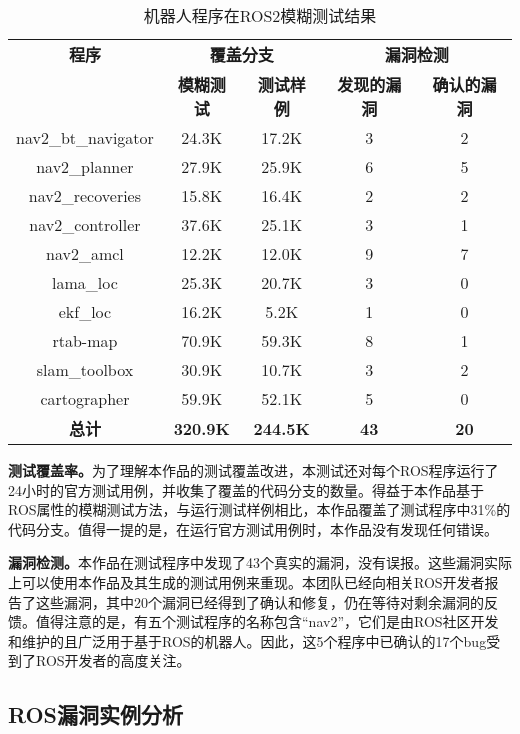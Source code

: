 \begin{table}[H]
	\small
	\caption{机器人程序在ROS2模糊测试结果}
	\centering
	\begin{tabular}{ccccc}
		\hline
		\textbf{程序} & \multicolumn{2}{c}{\textbf{覆盖分支}} & \multicolumn{2}{c}{\textbf{漏洞检测}} \\
		\cline{2-5}
		& \textbf{模糊测试} & \textbf{测试样例} & \textbf{发现的漏洞} & \textbf{确认的漏洞} \\
		\hline
		nav2\_bt\_navigator & 24.3K & 17.2K & 3 & 2 \\
		nav2\_planner & 27.9K & 25.9K & 6 & 5 \\
		nav2\_recoveries & 15.8K & 16.4K & 2 & 2 \\
		nav2\_controller & 37.6K & 25.1K & 3 & 1 \\
		nav2\_amcl & 12.2K & 12.0K & 9 & 7 \\
		lama\_loc & 25.3K & 20.7K & 3 & 0 \\
		ekf\_loc & 16.2K & 5.2K & 1 & 0 \\
		rtab-map & 70.9K & 59.3K & 8 & 1 \\
		slam\_toolbox & 30.9K & 10.7K & 3 & 2 \\
		cartographer & 59.9K & 52.1K & 5 & 0 \\
		\textbf{总计} & \textbf{320.9K} & \textbf{244.5K} & \textbf{43} & \textbf{20} \\
		\hline
	\end{tabular}
\end{table}

\textbf{测试覆盖率。}为了理解本作品的测试覆盖改进，本测试还对每个ROS程序运行了24小时的官方测试用例，并收集了覆盖的代码分支的数量。得益于本作品基于ROS属性的模糊测试方法，与运行测试样例相比，本作品覆盖了测试程序中31\%的代码分支。值得一提的是，在运行官方测试用例时，本作品没有发现任何错误。

\textbf{漏洞检测。}本作品在测试程序中发现了43个真实的漏洞，没有误报。这些漏洞实际上可以使用本作品及其生成的测试用例来重现。本团队已经向相关ROS开发者报告了这些漏洞，其中20个漏洞已经得到了确认和修复，仍在等待对剩余漏洞的反馈。值得注意的是，有五个测试程序的名称包含``nav2''，它们是由ROS社区开发和维护的且广泛用于基于ROS的机器人。因此，这5个程序中已确认的17个bug受到了ROS开发者的高度关注。

\subsection{ROS漏洞实例分析}


